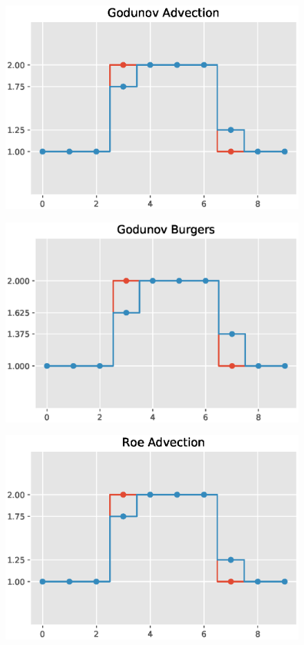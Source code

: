 \documentclass{article}
\begin{document}
  \begin{figure}[H]
  \centering
  \includegraphics[width=1\linewidth]{pics/Godunovadvection.eps}
  \label{fig:perf}
 \end{figure}

  \begin{figure}[H]
  \centering
  \includegraphics[width=1\linewidth]{pics/Godunovburgers.eps}
  \label{fig:perf}
 \end{figure}

  \begin{figure}[H]
  \centering
  \includegraphics[width=1\linewidth]{pics/Roeadvection.eps}
  \label{fig:perf}
 \end{figure}
\end{document}
